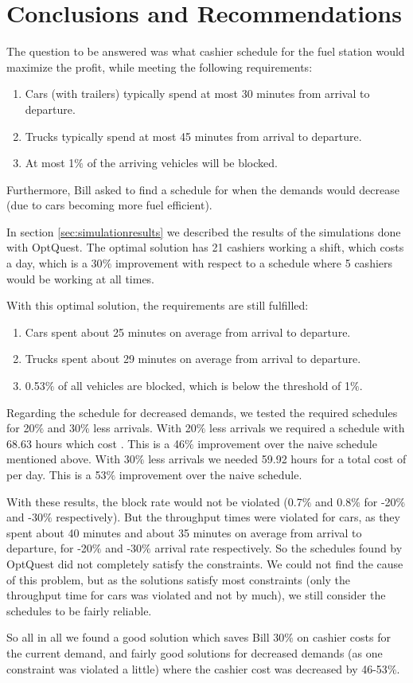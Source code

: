 \section{Conclusions and Recommendations}
The question to be answered was what cashier schedule for the fuel station would maximize the profit, while meeting the following requirements:
\begin{enumerate}
	\item Cars (with  trailers) typically spend at most 30 minutes from arrival to departure.
	\item Trucks typically spend at most 45 minutes from arrival to departure.
	\item At most 1$\%$ of the arriving vehicles will be blocked.
\end{enumerate}
Furthermore, Bill asked to find a schedule for when the demands would decrease (due to cars becoming more fuel efficient).

In section \ref{sec:simulationresults} we described the results of the simulations done with OptQuest. The optimal solution has 21 cashiers working a shift, which costs  a day, which is a 30$\%$ improvement with respect to a schedule where 5 cashiers would be working at all times.

With this optimal solution, the requirements are still fulfilled:
\begin{enumerate}
	\item Cars spent about 25 minutes on average from arrival to departure.
	\item Trucks spent about 29 minutes on average from arrival to departure.
	\item 0.53$\%$ of all vehicles are blocked, which is below the threshold of 1$\%$.
\end{enumerate}

Regarding the schedule for decreased demands, we tested the required schedules for 20$\%$ and 30$\%$ less arrivals. With 20$\%$ less arrivals we required a schedule with 68.63 hours which cost . This is a 46$\%$ improvement over the naive schedule mentioned above. With 30$\%$ less arrivals we needed 59.92 hours for a total cost of  per day. This is a 53$\%$ improvement over the naive schedule. 

With these results, the block rate would not be violated (0.7$\%$ and 0.8$\%$ for -20$\%$ and -30$\%$ respectively). But the throughput times were  violated for cars, as they spent about 40 minutes and about 35 minutes on average from arrival to departure, for -20$\%$ and -30$\%$ arrival rate respectively. So the schedules found by OptQuest did not completely satisfy the constraints. We could not find the cause of this problem, but as the solutions satisfy most constraints (only the throughput time for cars was violated and not by much), we still consider the schedules to be fairly reliable.

So all in all we found a good solution which saves Bill 30$\%$ on cashier costs for the current demand, and fairly good solutions for decreased demands (as one constraint was violated a little) where the cashier cost was decreased by 46-53$\%$.